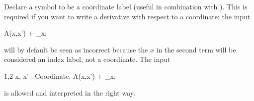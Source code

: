 
Declare a symbol to be a coordinate label (useful in combination
  with ). This is required if you want to write a
  derivative with respect to a coordinate: the input
\begin{screen}{1}
A(x,x') + _{x};
\end{screen}
will by default be seen as incorrect because the $x$ in the second
term will be considered an index label, not a coordinate. The input
\begin{screen}{1,2}
{ x, x' }::Coordinate.
A(x,x') + _{x};
\end{screen}
is allowed and interpreted in the right way.

